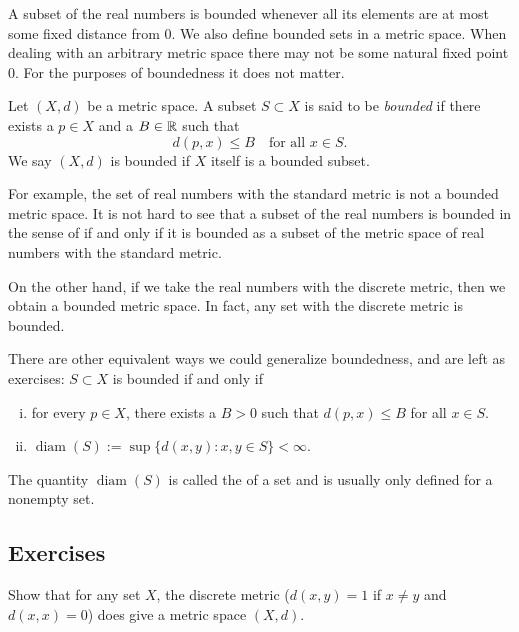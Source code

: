 \medskip

A subset of the real
numbers is bounded whenever all its elements are at most some fixed distance
from 0.
We also define bounded sets in a metric space.
When dealing with an arbitrary metric space there may not be some
natural fixed point 0.  For the purposes of boundedness it does not matter.

\begin{defn}
Let $(X,d)$ be a metric space.  A subset $S \subset X$ is said to be
\emph{bounded} if there exists a $p \in X$ and a
$B \in {\mathbb{R}}$ such that
\begin{equation*}
d(p,x) \leq B \quad \text{for all $x \in S$}.
\end{equation*}
We say $(X,d)$ is bounded if $X$ itself is a bounded subset.
\end{defn}

For example, the set of real numbers with the standard metric is not a
bounded metric space.  It is not hard to see that a
subset of the real numbers is bounded in the
sense of  if and only if it is bounded as a subset of the
metric space of real numbers with the standard metric.

On the other hand, if we take the real numbers with the discrete metric,
then we obtain a bounded metric space.  In fact, any set with the
discrete metric is bounded.

There are other equivalent ways we could generalize boundedness,
and are left as exercises:  $S \subset X$ is bounded if and only if
\begin{enumerate}[(i)]
\item 
for every $p \in X$, there exists a $B > 0$ such that $d(p,x) \leq B$ for
all $x \in S$.
\item 
{}
$\operatorname{diam}(S) := \sup \{ d(x,y) : x,y \in S \} < \infty$.
\end{enumerate}
The quantity $\operatorname{diam}(S)$ is called the
\emph{} of a set and is usually only defined for
a nonempty set.

\subsection{Exercises}

\begin{exercise}
Show that for any set $X$, the discrete metric ($d(x,y) = 1$ if $x\not=y$ and
$d(x,x) = 0$) does give a metric space $(X,d)$.
\end{exercise}

